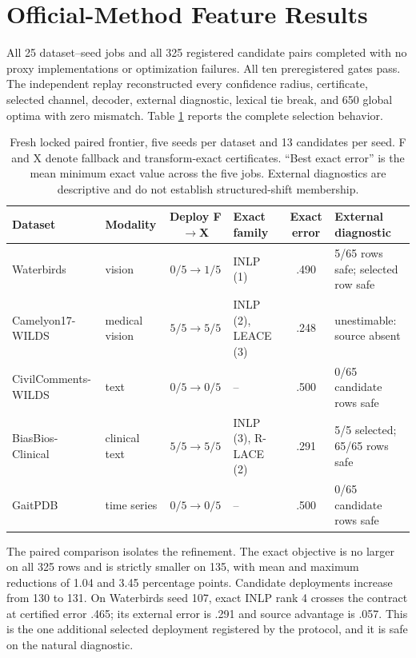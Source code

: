 \section{Official-Method Feature Results}

All 25 dataset--seed jobs and all 325 registered candidate pairs completed with
no proxy implementations or optimization failures. All ten preregistered gates
pass. The independent replay reconstructed every confidence radius,
certificate, selected channel, decoder, external diagnostic, lexical tie break,
and 650 global optima with zero mismatch. Table \ref{tab:realfrontier} reports
the complete selection behavior.

\begin{table}[t]
\centering
\footnotesize
\setlength{\tabcolsep}{3.2pt}
\begin{tabular}{llclcl}
\hline
Dataset & Modality & Deploy F$\to$X & Exact family & Exact error & External diagnostic \\
\hline
Waterbirds & vision & $0/5\!\to\!1/5$ & INLP (1) & .490 & 5/65 rows safe; selected row safe \\
Camelyon17-WILDS & medical vision & $5/5\!\to\!5/5$ & INLP (2), LEACE (3) & .248 & unestimable: source absent \\
CivilComments-WILDS & text & $0/5\!\to\!0/5$ & -- & .500 & 0/65 candidate rows safe \\
BiasBios-Clinical & clinical text & $5/5\!\to\!5/5$ & INLP (3), R-LACE (2) & .291 & 5/5 selected; 65/65 rows safe \\
GaitPDB & time series & $0/5\!\to\!0/5$ & -- & .500 & 0/65 candidate rows safe \\
\hline
\end{tabular}
\caption{Fresh locked paired frontier, five seeds per dataset and 13 candidates
per seed. F and X denote fallback and transform-exact certificates. ``Best
exact error'' is the mean minimum exact value across the five jobs. External
diagnostics are descriptive and do not establish structured-shift membership.}
\label{tab:realfrontier}
\end{table}

The paired comparison isolates the refinement. The exact objective is no larger
on all 325 rows and is strictly smaller on 135, with mean and maximum reductions
of 1.04 and 3.45 percentage points. Candidate deployments increase from 130 to
131. On Waterbirds seed 107, exact INLP rank 4 crosses the contract at certified
error .465; its external error is .291 and source advantage is .057. This is the
one additional selected deployment registered by the protocol, and it is safe
on the natural diagnostic.

